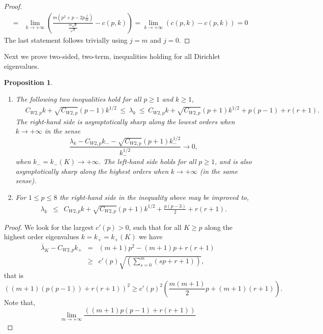 \documentclass[11pt,a4paper,times]{amsart}
\theoremstyle{plain}
\newtheorem{proposition}{Proposition}[section]
\theoremstyle{definition}
\numberwithin{equation}{section}
\newcommand{\Cwnp}[2]{ C_{W #1,#2}}
\newcommand{\txtr}{\textcolor{red}}
\begin{document}
{\begin{proof}
\begin{eqnarray*}
&=& 	\lim_{k\to +\infty}\left({\frac{m\left(p^2+p-2p\frac{j}{m}\right)}{\frac{m\sqrt{p}}{\sqrt{2}}}}-c(p,k)\right)=
\lim_{k\to +\infty}\left(c(p,k)-c(p,k)\right)=0
\end{eqnarray*}
The last statement follows  trivially using $j=m$ and $j=0$.
 \end{proof}
 Next we prove two-sided, two-term, inequalities holding for all Dirichlet eigenvalues.
%
\begin{proposition}
\begin{enumerate}[{\rm 1)}]
\item The following two inequalities hold for all $p\geq 1$ and $k\geq 1$,
\begin{gather}\label{twotermineq}
\quad\Cwnp{2}{p} k+\sqrt{\Cwnp{2}{p}}(p-1)k^{1/2}~\leq ~ \lambda_k~
 \leq~ C_{W 2,p} k+\sqrt{\Cwnp{2}{p}}(p+1)k^{1/2}+ p(p-1)+r(r+1).
\end{gather}
 The right-hand side is asymptotically sharp along the lowest orders when $k\to +\infty$ in the sense 
 \[\frac{\lambda_k- \Cwnp{2}{p} k_--\sqrt{\Cwnp{2}{p}}(p+1)k_-^{1/2}}{k_-^{1/2}}\to 0,\]
 when $k_-=k_-(K)\to +\infty$. The  left-hand side holds for all $p\geq 1$, and is also asymptotically
 sharp along the highest orders when $k\to +\infty$ (in the same sense). \\[1mm]
 \item For $1\leq p\leq 8$ the right-hand side in the inequality above may be improved to,
 \begin{eqnarray}\label{ddag}
  \lambda_k &\leq &\Cwnp{2}{p} k+\sqrt{\Cwnp{2}{p}}(p+1)
  k^{1/2}+ \frac{p(p-3)}{2}+r(r+1).%
\end{eqnarray}
\end{enumerate}
\end{proposition}
%
\begin{proof}
We look for the largest $c'(p)> 0$,  such that for all $K\geq p$ along the highest order eigenvalues $k=k_+=k_+(K)$ we have
\begin{eqnarray*}
\bar{\lambda}_{K}-\Cwnp{2}{p}k_+
&=&(m+1)p^2-(m+1)p+r(r+1)\nonumber \\
&\geq&
\label{lowerbound} c'(p)\sqrt{\left(\sum_{s=0}^m(sp+r+1)\right)}, 
\end{eqnarray*}
that is
\begin{equation}\label{c'1}
\left((m+1)(p(p-1))+r(r+1)\right)^2 \geq {c'}(p)^2\left(\frac{m(m+1)}{2}p + (m+1)(r+1)\right).
\end{equation}
Note that,
\[
\lim_{m\to +\infty}\frac{\left((m+1)p(p-1)+r(r+1)\right)}{
}\]
\end{proof}}
\end{document}
